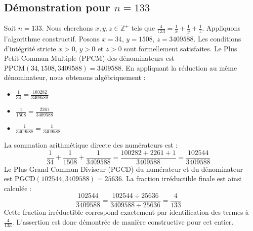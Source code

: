\documentclass[11pt,a4paper]{article}
\begin{document}
\subsection{Démonstration pour $n = 133$}
Soit $n = 133$. Nous cherchons $x, y, z \in \mathbb{Z}^{+}$ tels que $\frac{4}{133} = \frac{1}{x} + \frac{1}{y} + \frac{1}{z}$.
Appliquons l'algorithme constructif. Posons $x = 34$, $y = 1508$, $z = 3409588$.
Les conditions d'intégrité stricte $x > 0$, $y > 0$ et $z > 0$ sont formellement satisfaites.
Le Plus Petit Commun Multiple (PPCM) des dénominateurs est $\text{PPCM}(34, 1508, 3409588) = 3409588$.
En appliquant la réduction au même dénominateur, nous obtenons algébriquement :
\begin{itemize}
    \item $\frac{1}{34} = \frac{100282}{3409588}$
    \item $\frac{1}{1508} = \frac{2261}{3409588}$
    \item $\frac{1}{3409588} = \frac{1}{3409588}$
\end{itemize}
La sommation arithmétique directe des numérateurs est :
$$ \frac{1}{34} + \frac{1}{1508} + \frac{1}{3409588} = \frac{100282 + 2261 + 1}{3409588} = \frac{102544}{3409588} $$
Le Plus Grand Commun Diviseur (PGCD) du numérateur et du dénominateur est $\text{PGCD}(102544, 3409588) = 25636$.
La fraction irréductible finale est ainsi calculée :
$$ \frac{102544}{3409588} = \frac{102544 \div 25636}{3409588 \div 25636} = \frac{4}{133} $$
Cette fraction irréductible correspond exactement par identification des termes à $\frac{4}{133}$. L'assertion est donc démontrée de manière constructive pour cet entier.
\end{document}
